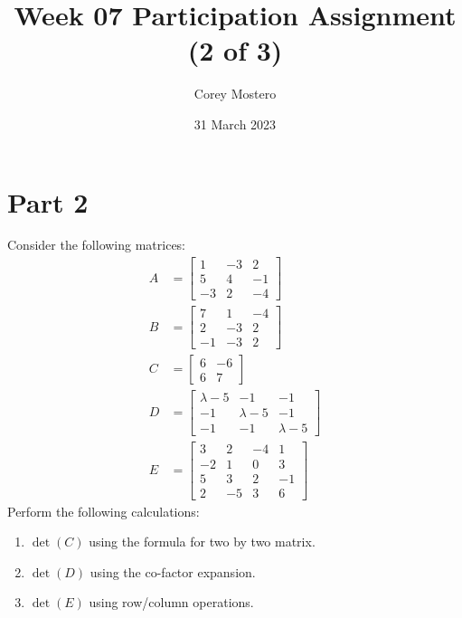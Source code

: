 \documentclass{article}
\title{Week 07 Participation Assignment (2 of 3)}
\author{Corey Mostero}
\date{31 March 2023}
\begin{document}
\newcommand{\hr}{\par\noindent\rule{\textwidth}{0.4pt}}

\newcommand{\bc}[1]{
	\begin{equation*}
		\begin{boxed}
			{#1}
		\end{boxed}
	\end{equation*}
}

\newcommand{\cond}[2]{
	\ifmmode
		{#1} \quad {#2}
	\else
		$$ {#1} \quad {#2} $$
	\fi
}

\maketitle
\newpage

\tableofcontents

\section{Part 2}
Consider the following matrices:
\begin{align*}
	A & = \begin{bmatrix}
		1 & -3 & 2 \\
		5 & 4 & -1 \\
		-3 & 2 & -4
	\end{bmatrix} \\
	B & = \begin{bmatrix}
		7 & 1 & -4 \\
		2 & -3 & 2 \\
		-1 & -3 & 2
	\end{bmatrix} \\
	C & = \begin{bmatrix}
		6 & -6 \\
		6 & 7
	\end{bmatrix} \\
	D & = \begin{bmatrix}
		\lambda - 5 & -1 & -1 \\
		-1 & \lambda - 5 & -1 \\
		-1 & -1 & \lambda - 5
	\end{bmatrix} \\
	E & = \begin{bmatrix}
		3 & 2 & -4 & 1 \\
		-2 & 1 & 0 & 3 \\
		5 & 3 & 2 & -1 \\
		2 & -5 & 3 & 6
	\end{bmatrix}
\end{align*}
Perform the following calculations:
\begin{enumerate}[label=\textbf{\arabic*).}]
	\item $ \det(C) $ using the formula for two by two matrix.
	\item $ \det(D) $ using the co-factor expansion.
	\item $ \det(E) $ using row/column operations.
\end{enumerate}
\end{document}
